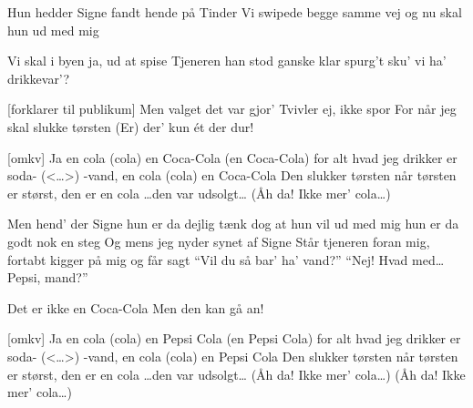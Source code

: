 \documentclass[a4paper,11pt]{article}
\begin{document}
\begin{song}

%
        Hun hedder Signe
        fandt hende på Tinder
        Vi swipede begge samme vej
        og nu skal hun ud med mig


%
        Vi skal i byen
        ja, ud at spise
        Tjeneren han stod ganske klar 
        spurg't sku' vi ha' drikkevar'?


[forklarer til publikum]
        Men valget det var gjor'
        Tvivler ej, ikke spor
        For når jeg skal slukke tørsten
        (Er) der' kun ét der dur!


[omkv]%
        Ja en cola (cola)
        en Coca-Cola (en Coca-Cola)
        for alt hvad jeg drikker er soda- (<{\ldots}>)
        -vand, en cola (cola)
        en Coca-Cola
        Den slukker tørsten når tørsten er størst, den
        er en cola
        {\ldots}den var udsolgt{\ldots}
        (Åh da! Ikke mer' cola{\ldots})



 Men hend' der Signe
        hun er da dejlig
        tænk dog at hun vil ud med mig
        hun er da godt nok en steg
        Og mens jeg nyder
        synet af Signe
        Står tjeneren foran mig, fortabt 
        kigger på mig og får sagt
        ``Vil du så bar' ha' vand?''
        ``Nej! Hvad med\ldots Pepsi, mand?'' 


%
        Det er ikke en Coca-Cola
        Men den kan gå an!


[omkv]%
        Ja en cola (cola)
        en Pepsi Cola (en Pepsi Cola)
        for alt hvad jeg drikker er soda- (<{\ldots}>)
        -vand, en cola (cola)
        en Pepsi Cola
        Den slukker tørsten når tørsten er størst, den
        er en cola
        {\ldots}den var udsolgt{\ldots}
        (Åh da! Ikke mer' cola{\ldots})
        (Åh da! Ikke mer' cola{\ldots})


\end{song}
\end{document}
